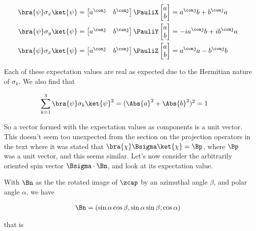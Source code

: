 \begin{align}\label{eqn:desaiCh5:301}
\bra{\psi} \sigma_x \ket{\psi}
&=
\begin{bmatrix}
a^\conj & b^\conj
\end{bmatrix}
\PauliX
\begin{bmatrix}
a \\
b
\end{bmatrix}
= a^\conj b + b^\conj a
\\
\bra{\psi} \sigma_y \ket{\psi}
&=
\begin{bmatrix}
a^\conj & b^\conj
\end{bmatrix}
\PauliY
\begin{bmatrix}
a \\
b
\end{bmatrix}
= - i a^\conj b + i b^\conj a 
\\
\bra{\psi} \sigma_x \ket{\psi}
&=
\begin{bmatrix}
a^\conj & b^\conj
\end{bmatrix}
\PauliZ
\begin{bmatrix}
a \\
b
\end{bmatrix}
= a^\conj a - b^\conj b 
\end{align}

Each of these expectation values are real as expected due to the Hermitian nature of $\sigma_k$.  We also find that

\begin{align}\label{eqn:desaiCh5:303}
\sum_{k=1}^3 {\bra{\psi} \sigma_k \ket{\psi}}^2 &= (\Abs{a}^2 + \Abs{b}^2)^2 = 1
\end{align}

So a vector formed with the expectation values as components is a unit vector.  This doesn't seem too unexpected from the section on the projection operators in the text where it was stated that $\bra{\chi} \Bsigma \ket{\chi} = \Bp$, where $\Bp$ was a unit vector, and this seems similar.  Let's now consider the arbitrarily oriented spin vector $\Bsigma \cdot \Bn$, and look at its expectation value.

With $\Bn$ as the the rotated image of $\zcap$ by an azimuthal angle $\beta$, and polar angle $\alpha$, we have

\begin{align}\label{eqn:desaiCh5:304}
\Bn = (\sin\alpha \cos\beta,\sin\alpha \sin\beta,\cos\alpha)
\end{align}

that is

